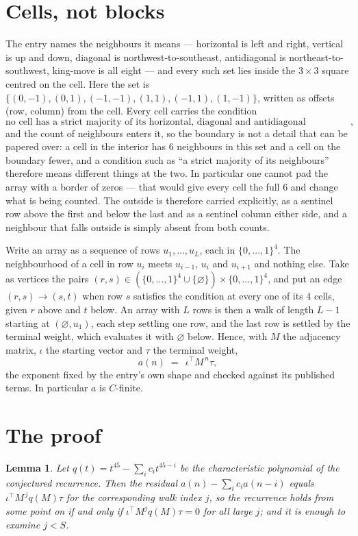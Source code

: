 \documentclass[11pt,a4paper]{article}
\theoremstyle{plain}
\newtheorem{lemma}[theorem]{Lemma}
\theoremstyle{definition}
\begin{document}
\section{Cells, not blocks}

The entry names the neighbours it means --- horizontal is left and right, vertical is up and
down, diagonal is northwest-to-southeast, antidiagonal is northeast-to-southwest, king-move is
all eight --- and every such set lies inside the $3\times3$ square centred on the cell. Here
the set is $\{(0,-1), (0,1), (-1,-1), (1,1), (-1,1), (1,-1)\}$, written as offsets (row, column) from the cell. Every cell carries
the condition
\[
\text{no cell has a strict majority of its horizontal, diagonal and antidiagonal neighbours equal to 1},
\]
and the count of neighbours enters it, so the boundary is not a detail that can be papered
over: a cell in the interior has $6$ neighbours in this set and a cell on the boundary
fewer, and a condition such as ``a strict majority of its neighbours'' therefore means
different things at the two. In particular one cannot pad the array with a border of zeros ---
that would give every cell the full $6$ and change what is being counted. The outside is
therefore carried
explicitly, as a sentinel row above the first and below the last and as a sentinel column
either side, and a neighbour that falls outside is simply absent from both counts.

Write an array as a sequence of rows $u_1,\dots,u_L$, each in
$\{0,\dots,1\}^{4}$. The neighbourhood of a cell in row $u_i$ meets $u_{i-1}$,
$u_i$ and $u_{i+1}$ and nothing else. Take as vertices the pairs
$(r,s)\in(\{0,\dots,1\}^{4}\cup\{\varnothing\})\times\{0,\dots,1\}^{4}$,
and put an edge $(r,s)\to(s,t)$ when row $s$ satisfies the condition at every one of its
$4$ cells, given $r$ above and $t$ below. An array with $L$ rows is then a walk of length
$L-1$ starting at $(\varnothing,u_1)$, each step settling one row, and the last row is
settled by the terminal weight, which evaluates it with $\varnothing$ below. Hence,
with $M$ the adjacency matrix, $\iota$ the starting vector and $\tau$ the terminal weight,
\[
a(n)\;=\;\,\iota^{\!\top}M^{\,n}\tau ,
\]
the exponent fixed by the entry's own shape and checked against its published terms. In
particular $a$ is $C$-finite.

\section{The proof}

\begin{lemma}\label{lem:crit}
Let $q(t)=t^{45}-\sum_i c_it^{45-i}$ be the characteristic polynomial of the
conjectured recurrence. Then the residual $a(n)-\sum_ic_ia(n-i)$ equals
$\iota^{\!\top}M^{\,j}q(M)\tau$ for the corresponding walk index $j$, so the
recurrence holds from some point on if and only if $\iota^{\!\top}M^{j}q(M)\tau=0$ for all
large $j$; and it is enough to examine $j<S$.
\end{lemma}
\end{document}
